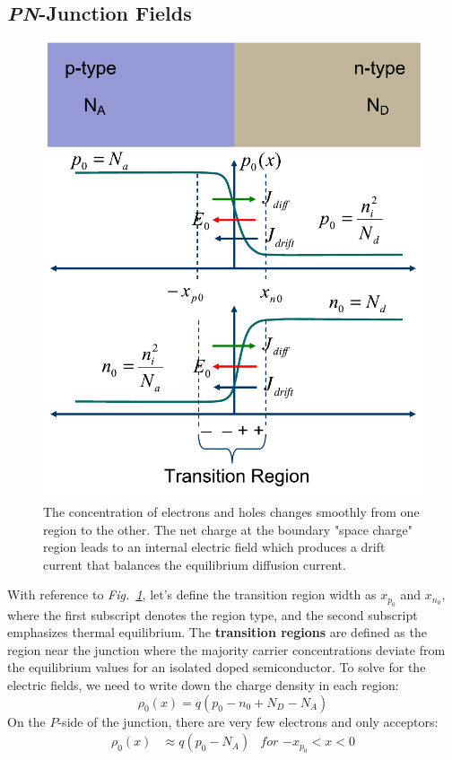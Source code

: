 \subsection{\emph{PN}-Junction Fields}
\begin{figure}[tb]
\centering
\includegraphics[width=.5\columnwidth]{slide11}
\caption{The concentration of electrons and holes changes smoothly from one region to the other.  The net charge at the boundary "space charge" region leads to an internal electric field which produces a drift current that balances the equilibrium diffusion current.}
\label{fig:slide11}
\end{figure}
With reference to \emph{Fig.~\ref{fig:slide11}}, let's define the transition region width as $x_{p_0}$ and $x_{n_0}$, where the first subscript denotes the region type, and the second subscript emphasizes thermal equilibrium.  The \textbf{transition regions} are defined as the region near the junction where the majority carrier concentrations deviate from the equilibrium values for an isolated doped semiconductor.  To solve for the electric fields, we need to write down the charge density in each region:
    \begin{equation} 
        \rho _0(x) = q(p_0 - n_0 + N_D - N_A) 
    \end{equation}
On the $P$-side of the junction, there are very few electrons and only acceptors:
    \begin{align} 
        \rho _0(x) &\approx q(p_0 - N_A) &\textit{for $-x_{p_0} < x < 0$} 
    \end{align}
